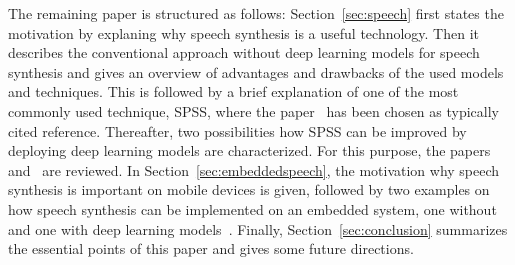 The remaining paper is structured as follows: Section~\ref{sec:speech} first states the motivation by explaning why speech synthesis is a useful technology. Then it describes the conventional approach without deep learning models for speech synthesis and gives an overview of advantages and drawbacks of the used models and techniques. This is followed by a brief explanation of one of the most commonly used technique, \ac{SPSS}, where the paper~\cite{black:statistical} has been chosen as typically cited reference. Thereafter, two possibilities how \ac{SPSS} can be improved by deploying deep learning models are characterized. For this purpose, the papers~\cite{zen:deepstatistical} and~\cite{hashimoto:effect} are reviewed. In Section~\ref{sec:embeddedspeech}, the motivation why speech synthesis is important on mobile devices is given, followed by two examples on how speech synthesis can be implemented on an embedded system, one without~\cite{toth:optimizing} and one with deep learning models~\cite{boros:robust}. Finally, Section~\ref{sec:conclusion} summarizes the essential points of this paper and gives some future directions.